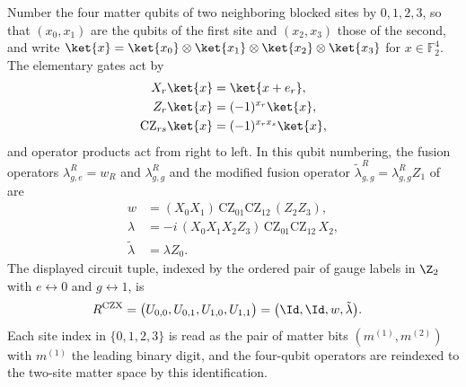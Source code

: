 \begin{definition}
    \label{def:mpug_czx_circuit_tuple}
    \leanok
    Number the four matter qubits of two neighboring blocked sites by
    $0,1,2,3$, so that $(x_0,x_1)$ are the qubits of the first site and
    $(x_2,x_3)$ those of the second, and write
    $\ket{x}=\ket{x_0}\otimes\ket{x_1}\otimes\ket{x_2}\otimes\ket{x_3}$ for
    $x\in\mathbb F_2^4$. The elementary gates act by
    \begin{align}
        X_r\ket{x}              & =\ket{x+e_r},          \\
        Z_r\ket{x}              & =(-1)^{x_r}\ket{x},    \\
        \mathrm{CZ}_{rs}\ket{x} & =(-1)^{x_rx_s}\ket{x},
    \end{align}
    and operator products act from right to left. In this qubit
    numbering, the fusion operators $\lambda^R_{g,e}=w_R$ and
    $\lambda^R_{g,g}$ and the modified fusion operator
    $\tilde\lambda^R_{g,g}=\lambda^R_{g,g}Z_1$ of
    \cite[lines~4503--5183]{FrancoRubio2025MPUGauging} are
    \begin{align}
        w             & =(X_0X_1)\,\mathrm{CZ}_{01}\mathrm{CZ}_{12}\,(Z_2Z_3),
        \label{eq:mpug_czx_w}                                                       \\
        \lambda       & =-i\,(X_0X_1X_2Z_3)\,\mathrm{CZ}_{01}\mathrm{CZ}_{12}\,X_2,
        \label{eq:mpug_czx_lambda}                                                  \\
        \tilde\lambda & =\lambda Z_0.
        \label{eq:mpug_czx_tilde_lambda}
    \end{align}
    The displayed circuit tuple, indexed by the ordered pair of
    gauge labels in $\Z_2$ with $e\leftrightarrow0$ and $g\leftrightarrow1$,
    is
    \begin{align}
        R^{\mathrm{CZX}}
         & =\bigl(U_{0,0},U_{0,1},U_{1,0},U_{1,1}\bigr)
        =\bigl(\Id,\Id,w,\tilde\lambda\bigr).
        \label{eq:mpug_czx_tuple}
    \end{align}
    Each site index in $\{0,1,2,3\}$ is read as the pair of matter bits
    $(m^{(1)},m^{(2)})$ with $m^{(1)}$ the leading binary digit, and the
    four-qubit operators are reindexed to the two-site matter space by
    this identification.
\end{definition}

